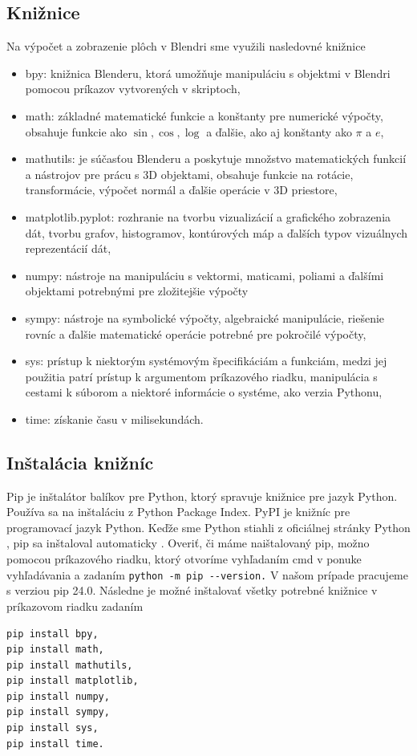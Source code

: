 \subsection{Knižnice}
Na výpočet a zobrazenie plôch v Blendri sme využili nasledovné knižnice
\begin{itemize}
\item bpy: knižnica Blenderu, ktorá umožňuje manipuláciu s objektmi v Blendri pomocou príkazov vytvorených v skriptoch,
\item math: základné matematické funkcie a konštanty pre numerické výpočty, obsahuje funkcie ako $\sin, \cos, \log$ a ďalšie, ako aj konštanty ako $\pi$ a $e$,
\item mathutils: je súčasťou Blenderu a poskytuje množstvo matematických funkcií a nástrojov pre prácu s 3D objektami, obsahuje funkcie na rotácie, transformácie, výpočet normál a ďalšie operácie v 3D priestore,
\item matplotlib.pyplot: rozhranie na tvorbu vizualizácií a grafického zobrazenia dát, tvorbu grafov, histogramov, kontúrových máp a ďalších typov vizuálnych reprezentácií dát,
\item numpy: nástroje na manipuláciu s vektormi, maticami, poliami a ďalšími objektami potrebnými pre zložitejšie výpočty 
\item sympy: nástroje na symbolické výpočty, algebraické manipulácie, riešenie rovníc a ďalšie matematické operácie potrebné pre pokročilé výpočty,
\item sys: prístup k niektorým systémovým špecifikáciám a funkciám, medzi jej použitia patrí prístup k argumentom príkazového riadku, manipulácia s cestami k súborom a niektoré informácie o systéme, ako verzia Pythonu,
\item time: získanie času v milisekundách. 
\end{itemize}
\subsection{Inštalácia knižníc}
Pip je inštalátor balíkov pre Python, ktorý spravuje knižnice pre jazyk Python. Používa sa na inštaláciu z Python Package Index. PyPI je knižníc pre programovací jazyk Python. Keďže sme Python stiahli z oficiálnej stránky Python \cite{PythonDownload}, pip sa inštaloval automaticky \cite{Pip}. Overiť, či máme naištalovaný pip, možno pomocou príkazového riadku, ktorý otvoríme vyhľadaním cmd v ponuke vyhľadávania a zadaním
\verb|python -m pip --version.|
V našom prípade pracujeme s verziou pip 24.0. Následne je možné inštalovať všetky potrebné knižnice v príkazovom riadku zadaním
\begin{verbatim}
pip install bpy,
pip install math,
pip install mathutils,
pip install matplotlib,
pip install numpy,
pip install sympy,
pip install sys,
pip install time.
\end{verbatim}
